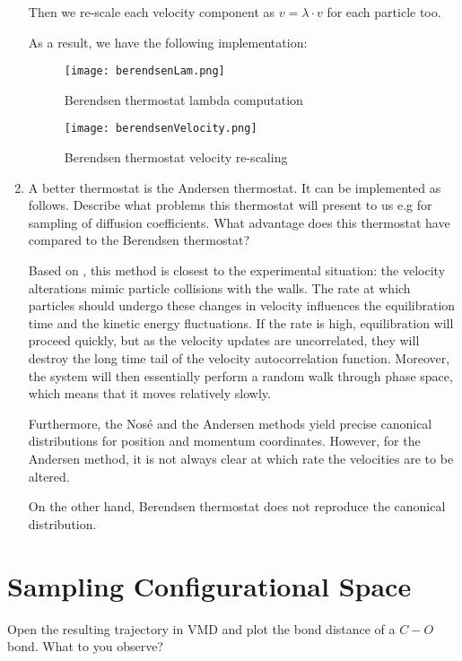 \documentclass[12pt,letterpaper]{report}
\begin{document}
\begin{enumerate}
		Then we re-scale each velocity component as $v = \lambda \cdot v$ for each particle too.
		
		As a result, we have the following implementation:
		
		\begin{figure}[H]
			\centering
			\texttt{[image: berendsenLam.png]}		
			\caption{Berendsen thermostat lambda computation}
			\label{fig::berendsenLam}
		\end{figure}  
	
		\begin{figure}[H]
			\centering
			\texttt{[image: berendsenVelocity.png]}		
			\caption{Berendsen thermostat velocity re-scaling}
			\label{fig::berendsenVelocity}
		\end{figure}  
		
		\item
		A better thermostat is the Andersen thermostat. It can be implemented as follows. Describe what problems this thermostat will present to us e.g for sampling of diffusion coefficients. What advantage does this thermostat have compared to the Berendsen thermostat?
		
		Based on \cite{thijssen_2007}, this method is closest to the experimental situation: the velocity alterations mimic particle collisions with the walls. The rate at which particles should undergo these changes in velocity influences the equilibration time and the kinetic energy fluctuations.	If the rate is high, equilibration will proceed quickly, but as the velocity updates are uncorrelated, they will destroy the long time tail of the velocity autocorrelation function. Moreover, the system will then essentially perform a random walk	through phase space, which means that it moves relatively slowly.
		
		Furthermore, the Nosé and the Andersen methods yield precise canonical distributions for position and momentum coordinates. However, for the Andersen method, it is not always clear at which rate the velocities are to be altered.
		
		On the other hand, Berendsen thermostat does not reproduce the canonical distribution.
		
	\end{enumerate}
  
  \section*{Sampling Configurational Space}
  Open the resulting trajectory in VMD and plot the bond distance of a $C-O$ bond. What to you observe?
  
\end{document}
